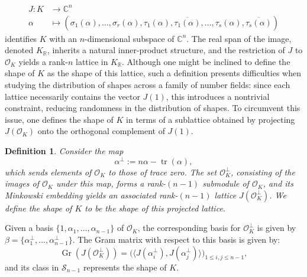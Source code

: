 \documentclass[table]{amsart}
\newtheorem{definition}[theorem]{Definition}
\newcommand{\cO}{\mathcal{O}}
\numberwithin{equation}{section}
\begin{document}
\[
\begin{aligned}
    J: K &\to \mathbb{C}^{n} \\
    \alpha &\mapsto \left( \sigma_1(\alpha), \ldots, \sigma_r(\alpha), \tau_1(\alpha), \overline{\tau_1(\alpha)}, \ldots, \tau_s(\alpha), \overline{\tau_s(\alpha)} \right)
\end{aligned}
\]
identifies $ K $ with an $ n $-dimensional subspace of $ \mathbb{C}^n $. The real span of the image, denoted $ K_{\mathbb{R}} $, inherits a natural inner-product structure, and the restriction of $ J $ to $ \mathcal{O}_{K} $ yields a rank-$ n $ lattice in $ K_{\mathbb{R}} $. Although one might be inclined to define the shape of $ K $ as the shape of this lattice, such a definition presents difficulties when studying the distribution of shapes across a family of number fields: since each lattice necessarily contains the vector $ J(1) $, this introduces a nontrivial constraint, reducing randomness in the distribution of shapes. To circumvent this issue, one defines the shape of $ K $ in terms of a sublattice obtained by projecting $ J(\mathcal{O}_K) $ onto the orthogonal complement of $ J(1) $. 
\begin{definition}
Consider the map  
\[
\alpha^{\perp} := n\alpha - \operatorname{tr}(\alpha),
\]
which sends elements of $ \mathcal{O}_K $ to those of trace zero. The set $ \mathcal{O}_K^{\perp} $, consisting of the images of $ \mathcal{O}_K $ under this map, forms a rank-$(n-1)$ submodule of $ \mathcal{O}_K $, and its Minkowski embedding yields an associated rank-$(n-1)$ lattice $J(\cO_K^\perp)$. We define the shape of $ K $ to be the shape of this projected lattice.
\end{definition}Given a basis $ \{1, \alpha_1, \dots, \alpha_{n-1}\} $ of $ \mathcal{O}_K $, the corresponding basis for $ \mathcal{O}_K^{\perp} $ is given by $\beta= \{\alpha_1^{\perp}, \dots, \alpha_{n-1}^{\perp} \} $. The Gram matrix with respect to this basis is given by:  
\[
\operatorname{Gr}\left(J\left(\mathcal{O}_{K}^{\perp}\right)\right) = \big( \langle J(\alpha_i^{\perp}), J(\alpha_j^{\perp}) \rangle \big)_{1\leq i,j\leq n-1},
\]
and its class in $\mathcal{S}_{n-1}$ represents the shape of $K$. 
\end{document}
